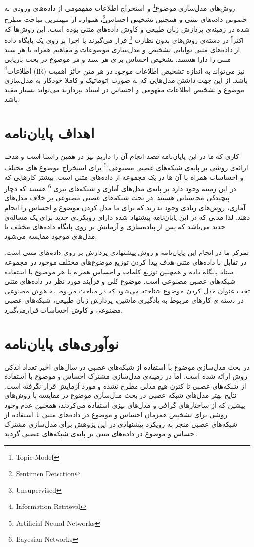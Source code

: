 		روش‌های مدل‌سازی موضوع\footnote{Topic Model}
 		و استخراج اطلاعات مفهمومی از داده‌های ورودی به خصوص داده‌های متنی و همچنین تشخیص احساس\footnote{Sentimen Detection}،
 		 همواره از مهمترین مباحث مطرح شده در زمینه‌ی پردازش زبان طبیعی و کاوش داده‌های متنی بوده است. این روش‌ها که اکثراً در دسته‌ی روش‌های بدون نظارت \footnote{Unsupervised}
 		 قرار می‌‌گیرند با اجرا بر روی یک پایگاه داده‌ از داده‌های متنی توانایی تشخیص و مدل‌سازی موضوعات و مفاهیم همراه با هر سند متنی را دارا هستند. تشخیص احساس برای هر سند و هر موضوع در بحث بازیابی اطلاعات\footnote{Information Retrieval}
 (IR)
 		 نیز می‌‌تواند به اندازه تشخیص اطلاعات موجود در هر متن حائز اهمیت باشد. از این جهت داشتن مدل‌هایی که به صورت اتوماتیک و کاملا خودکار به مدل‌سازی موضوع و تشخیص اطلاعات مفهومی‌ و احساس در اسناد بپردازند می‌تواند بسیار مفید باشد.
 		
\section{اهداف پایان‌نامه}
کاری که ما در این پایان‌‌نامه قصد انجام آن را داریم نیز در همین راستا است و هدف ارائه‌ی روشی‌ بر پایه‌ی شبکه‌های عصبی مصنوعی \footnote{Artificial Neural Networks}
برای استخراج موضوع های مختلف و احساسا‌ت همراه  با آن ها در یک مجموعه از داده‌های متنی است. بیشتر کارهایی که در این زمینه وجود دارد بر پایه‌ی مدل‌های آماری و شبکه‌های بیزی \footnote{Bayesian Networks}
هستند که دچار پیچیدگی محاسباتی هستند. در بحث شبکه‌های عصبی مصنوعی بر خلاف مدل‌های آماری، روش‌های زیادی وجود ندارند که برای ما مدل کردن موضوع و احساس را انجام دهند. لذا مدلی‌ که در این پایان‌‌نامه پیشنهاد شده دارای رویکردی جدید برای یک مساله‌ی جدید می‌باشد که پس از پیاده‌سازی و آزمایش بر روی پایگاه داده‌های مختلف با مدل‌های موجود مقایسه می‌‌شود.


تمرکز ما در انجام این پایان‌‌نامه و روش پیشنهادی پردازش بر روی داده‌های متنی است. در تقابل با داده‌های متنی هدف پیدا کردن توزیع موضوع‌های مختلف موجود در مجموعه اسناد پایگاه داده و همچنین توزیع کلمات و احساس همراه با هر موضوع با استفاده شبکه‌های عصبی مصنوعی است. موضوع کلی و فرآیند مورد نظر در داده‌های متنی تحت عنوان مدل کردن موضوع شناخته می‌‌شود که در مباحث مربوط به هوش مصنوعی در دسته ی کارهای مربوط به یادگیری ماشین، پردازش زبان طبیعی، شبکه‌های عصبی مصنوعی و کاوش احساسات قرارمی‌‌گیرد.

\section{نوآوری‌های پایان‌نامه}
در بحث مدل‌سازی موضوع با استفاده از شبکه‌های عصبی در سال‌های اخیر تعداد اندکی‌ روش ارائه شده است. اما در زمینه‌‌ی مدل‌سازی مشترک احساس و موضوع با استفاده از شبکه‌های عصبی تا کنون هیچ مدلی‌ مطرح نشده و مورد آزمایش قرار نگرفته است. نتایج بهتر مدل‌های شبکه عصبی در بحث مدل‌سازی موضوع در مقایسه با روش‌های پیشین که از ساختارهای گرافی‌ و مدل‌های بیزی استفاده می‌‌کردند، همچنین عدم وجود روشی‌ برای تشخیص همزمان احساس و موضوع در داده‌های متنی با استفاده از شبکه‌های عصبی منجر به رویکرد پیشنهادی در این پژوهش برای مدل‌سازی مشترک احساس و موضوع در داده‌های متنی بر پایه‌ی شبکه‌های عصبی گردید.

